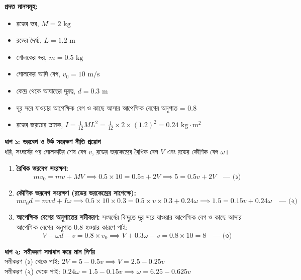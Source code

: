 \documentclass[12pt, a4paper]{article}
\begin{document}
\begin{tcolorbox}[solutionbox={সমাধান (Solution)}]
\noindent
\textbf{প্রদত্ত মানসমূহ:}
\begin{itemize}[leftmargin=*, parsep=0.3ex]
    \item রডের ভর, $M = 2\text{ kg}$
    \item রডের দৈর্ঘ্য, $L = 1.2\text{ m}$
    \item গোলকের ভর, $m = 0.5\text{ kg}$
    \item গোলকের আদি বেগ, $v_0 = 10\text{ m/s}$
    \item কেন্দ্র থেকে আঘাতের দূরত্ব, $d = 0.3\text{ m}$
    \item দূর সরে যাওয়ার আপেক্ষিক বেগ ও কাছে আসার আপেক্ষিক বেগের অনুপাত = $0.8$
    \item রডের জড়তার ভ্রামক, $I = \frac{1}{12}ML^2 = \frac{1}{12} \times 2 \times (1.2)^2 = 0.24\text{ kg}\cdot\text{m}^2$
\end{itemize}

\vspace{0.5em}
\noindent
\textbf{ধাপ ১: ভরবেগ ও টর্ক সংরক্ষণ নীতি প্রয়োগ} \\
ধরি, সংঘর্ষের পর গোলকটির শেষ বেগ $v$, রডের ভরকেন্দ্রের রৈখিক বেগ $V$ এবং রডের কৌণিক বেগ $\omega$।
\begin{enumerate}[leftmargin=*, parsep=0.3ex]
    \item \textbf{রৈখিক ভরবেগ সংরক্ষণ:}
    \[ m v_0 = m v + M V \implies 0.5 \times 10 = 0.5v + 2V \implies 5 = 0.5v + 2V \quad \text{--- (১)} \]
    \item \textbf{কৌণিক ভরবেগ সংরক্ষণ (রডের ভরকেন্দ্রের সাপেক্ষে):}
    \[ m v_0 d = m v d + I \omega \implies 0.5 \times 10 \times 0.3 = 0.5 \times v \times 0.3 + 0.24\omega \implies 1.5 = 0.15v + 0.24\omega \quad \text{--- (২)} \]
    \item \textbf{আপেক্ষিক বেগের অনুপাতের সমীকরণ:}
    সংঘর্ষের বিন্দুতে দূর সরে যাওয়ার আপেক্ষিক বেগ ও কাছে আসার আপেক্ষিক বেগের অনুপাত $0.8$ হওয়ার কারণে পাই:
    \[ V + \omega d - v = 0.8 \times v_0 \implies V + 0.3\omega - v = 0.8 \times 10 = 8 \quad \text{--- (৩)} \]
\end{enumerate}

\vspace{0.5em}
\noindent
\textbf{ধাপ ২: সমীকরণ সমাধান করে মান নির্ণয়} \\
সমীকরণ (১) থেকে পাই: $2V = 5 - 0.5v \implies V = 2.5 - 0.25v$ \\
সমীকরণ (২) থেকে পাই: $0.24\omega = 1.5 - 0.15v \implies \omega = 6.25 - 0.625v$


\end{tcolorbox}
\end{document}
